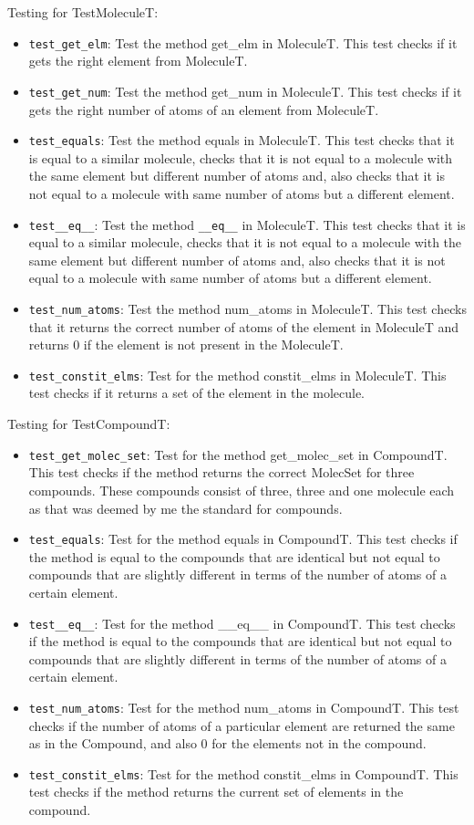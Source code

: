 \documentclass[12pt]{article}
\begin{document}
Testing for TestMoleculeT:
\begin{itemize}
\item \texttt{test\_get\_elm}: Test the method get\_elm in MoleculeT. This test checks if it gets the right element from MoleculeT.
\item \texttt{test\_get\_num}: Test the method get\_num in MoleculeT. This test checks if it gets the right number of atoms of an element from MoleculeT.
\item \texttt{test\_equals}: Test the method equals in MoleculeT. This test checks that it is equal to a similar molecule, checks that it is not equal to a molecule with the same element but different number of atoms and, also checks that it is not equal to a molecule with same number of atoms but a different element.
\item \texttt{test\_\_eq\_\_}: Test the method \texttt{\_\_eq\_\_} in MoleculeT. This test checks that it is equal to a similar molecule, checks that it is not equal to a molecule with the same element but different number of atoms and, also checks that it is not equal to a molecule with same number of atoms but a different element.
\item \texttt{test\_num\_atoms}: Test the method num\_atoms  in MoleculeT. This test checks that it returns the correct number of atoms of the element in MoleculeT and returns 0 if the element is not present in the MoleculeT. 
\item \texttt{test\_constit\_elms}: Test for the method constit\_elms in MoleculeT. This test checks if it returns a set of the element in the molecule. 
\end{itemize}

Testing for TestCompoundT:
\begin{itemize}
\item \texttt{test\_get\_molec\_set}: Test for the method get\_molec\_set in CompoundT. This test checks if the method returns the correct MolecSet for three compounds. These compounds consist of three, three and one molecule each as that was deemed by me the standard for compounds. 
\item \texttt{test\_equals}: Test for the method equals in CompoundT. This test checks if the method is equal to the compounds that are identical but not equal to compounds that are slightly different in terms of the number of atoms of a certain element.
\item \texttt{test\_\_eq\_\_}: Test for the method \_\_eq\_\_ in CompoundT. This test checks if the method is equal to the compounds that are identical but not equal to compounds that are slightly different in terms of the number of atoms of a certain element.
\item \texttt{test\_num\_atoms}: Test for the method num\_atoms in CompoundT. This test checks if the number of atoms of a particular element are returned the same as in the Compound, and also 0 for the elements not in the compound. 
\item \texttt{test\_constit\_elms}: Test for the method constit\_elms in CompoundT. This test checks if the method returns the current set of elements in the compound.\\
\end{itemize}
\end{document}
